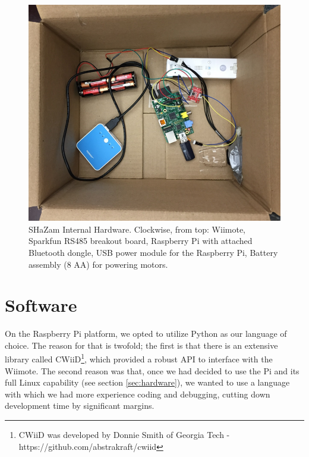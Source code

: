 \documentclass[conference, twocolumn]{IEEEtran}
\begin{document}
\begin{figure}[!t]
\begin{center}
\includegraphics[width=0.8\linewidth]{../images/shazam_inner}
\end{center}

\caption{SHaZam Internal Hardware. Clockwise, from top: Wiimote, Sparkfun RS485 breakout board, Raspberry Pi with attached Bluetooth dongle, USB power module for the Raspberry Pi, Battery assembly (8 AA) for powering motors.}
\label{fig:hw_inner}
\end{figure}

\section{Software}
On the Raspberry Pi platform, we opted to utilize Python as our language of choice. The reason for that is twofold; the first is that there is an extensive library called CWiiD\footnote{CWiiD was developed by Donnie Smith of Georgia Tech - https://github.com/abstrakraft/cwiid}, which provided a robust API to interface with the Wiimote. The second reason was that, once we had decided to use the Pi and its full Linux capability (see section \ref{sec:hardware}), we wanted to use a language with which we had more experience coding and debugging, cutting down development time by significant margins. 
\end{document}
